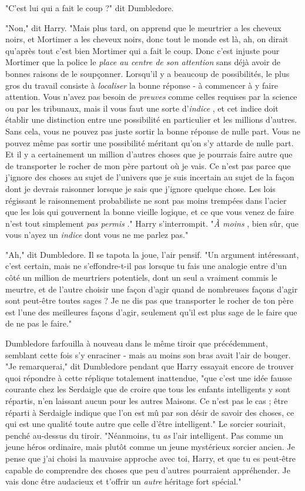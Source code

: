 "C'est lui qui a fait le coup ?" dit Dumbledore.

"Non," dit Harry. "Mais plus tard, on apprend que le meurtrier a les cheveux noirs, et Mortimer a les cheveux noirs, donc tout le monde est là, ah, on dirait qu'après tout c'est bien Mortimer qui a fait le coup. Donc c'est injuste pour Mortimer que la police le \emph{place au centre de son attention}  sans déjà avoir de bonnes raisons de le soupçonner. Lorsqu'il y a beaucoup de possibilités, le plus gros du travail consiste à \emph{localiser}  la bonne réponse - à commencer à y faire attention. Vous n'avez pas besoin de \emph{preuves}  comme celles requises par la science ou par les tribunaux, mais il vous faut une sorte d'\emph{indice} , et cet indice doit établir une distinction entre une possibilité en particulier et les millions d'autres. Sans cela, vous ne pouvez pas juste sortir la bonne réponse de nulle part. Vous ne pouvez même pas sortir une possibilité méritant qu'on s'y attarde de nulle part. Et il y a certainement un million d'autres choses que je pourrais faire autre que de transporter le rocher de mon père partout où je vais. Ce n'est pas parce que j'ignore des choses au sujet de l'univers que je suis incertain au sujet de la façon dont je devrais raisonner lorsque je sais que j'ignore quelque chose. Les lois régissant le raisonnement probabiliste ne sont pas moins trempées dans l'acier que les lois qui gouvernent la bonne vieille logique, et ce que vous venez de faire n'est tout simplement \emph{pas permis} ." Harry s'interrompit. "\emph{À moins} , bien sûr, que vous n'ayez un \emph{indice } dont vous ne me parlez pas."

"Ah," dit Dumbledore. Il se tapota la joue, l'air pensif. "Un argument intéressant, c'est certain, mais ne s'effondre-t-il pas lorsque tu fais une analogie entre d'un côté un million de meurtriers potentiels, dont un seul a vraiment commis le meurtre, et de l'autre choisir une façon d'agir quand de nombreuses façons d'agir sont peut-être toutes sages ? Je ne dis pas que transporter le rocher de ton père est l'une des meilleures façons d'agir, seulement qu'il est plus sage de le faire que de ne pas le faire."

Dumbledore farfouilla à nouveau dans le même tiroir que précédemment, semblant cette fois s'y enraciner - mais au moins son bras avait l'air de bouger. "Je remarquerai," dit Dumbledore pendant que Harry essayait encore de trouver quoi répondre à cette réplique totalement inattendue, "que c'est une idée fausse courante chez les Serdaigle que de croire que tous les enfants intelligents y sont répartis, n'en laissant aucun pour les autres Maisons. Ce n'est pas le cas ; être réparti à Serdaigle indique que l'on est mû par son désir de savoir des choses, ce qui est une qualité toute autre que celle d'être intelligent." Le sorcier souriait, penché au-dessus du tiroir. "Néanmoins, tu \emph{as}  l'air intelligent. Pas comme un jeune héros ordinaire, mais plutôt comme un jeune mystérieux sorcier ancien. Je pense que j'ai choisi la mauvaise approche avec toi, Harry, et que tu es peut-être capable de comprendre des choses que peu d'autres pourraient appréhender. Je vais donc être audacieux et t'offrir un \emph{autre}  héritage fort spécial."


